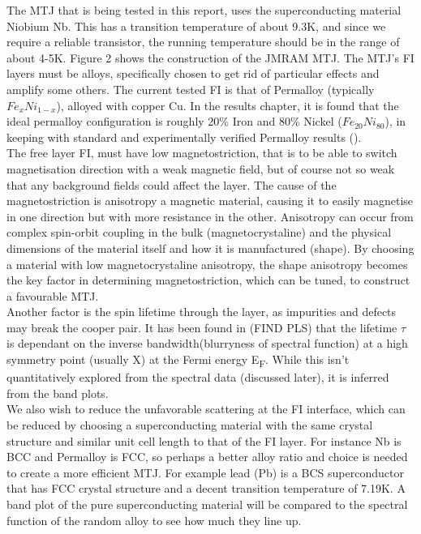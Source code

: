 \documentclass[12pt]{article}
\begin{document}
The MTJ that is being tested in this report, uses the superconducting material Niobium Nb. This has a transition temperature of about 9.3K, and since we require a reliable transistor, the running temperature should be in the range of about 4-5K. Figure 2 shows the construction of the JMRAM MTJ. The MTJ's FI layers must be alloys, specifically chosen to get rid of particular effects and amplify some others. The current tested FI is that of Permalloy (typically $Fe_{x}Ni_{1-x}$), alloyed with copper Cu. In the results chapter, it is found that the ideal permalloy configuration is roughly 20\% Iron and 80\% Nickel ($Fe_{20}Ni_{80}$), in keeping with standard and experimentally verified Permalloy results (\cite{permprob}).
\\
The free layer FI, must have low magnetostriction, that is to be able to switch magnetisation direction with a weak magnetic field, but of course not so weak that any background fields could affect the layer. The cause of the magnetostriction is anisotropy a magnetic material, causing it to easily magnetise in one direction but with more resistance in the other. Anisotropy can occur from complex spin-orbit coupling in the bulk (magnetocrystaline) and the physical dimensions of the material itself and how it is manufactured (shape). By choosing a material with low magnetocrystaline anisotropy, the shape anisotropy becomes the key factor in determining magnetostriction, which can be tuned, to construct a favourable MTJ. 
\\
Another factor is the spin lifetime through the layer, as impurities and defects may break the cooper pair. It has been found in (FIND PLS) that the lifetime $\tau$ is dependant on the inverse bandwidth(blurryness of spectral function) at a high symmetry point (usually X) at the Fermi energy E\textsubscript{F}. While this isn't quantitatively explored from the spectral data (discussed later), it is inferred from the band plots.
\\
We also wish to reduce the unfavorable scattering at the FI interface, which can be reduced by choosing a superconducting material with the same crystal structure and similar unit cell length to that of the FI layer. For instance Nb is BCC \cite{ashcroft} and Permalloy is FCC, so perhaps a better alloy ratio and choice is needed to create a more efficient MTJ. For example lead (Pb) is a BCS superconductor that has FCC crystal structure\cite{ashcroft} and a decent transition temperature of 7.19K. A band plot of the pure superconducting material will be compared to the spectral function of the random alloy to see how much they line up.
\end{document}
